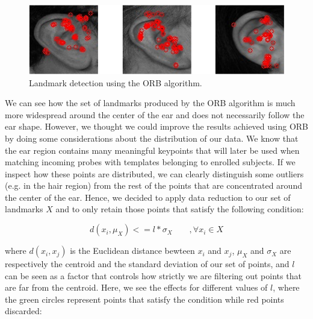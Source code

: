 \documentclass{article}
\begin{document}
\begin{figure}[h]
    \label{fig:landmark_orb}
    \begin{center}
        \includegraphics[width=12cm,keepaspectratio]{images/landmark_orb.png}
        \caption{Landmark detection using the ORB algorithm.}
    \end{center}
\end{figure}

We can see how the set of landmarks produced by the ORB algorithm is much more widespread around the
center of the ear and does not necessarily follow the ear shape. However, we thought we could improve the
results achieved using ORB by doing some considerations about the distribution of our data. We know that the ear
region contains many meaningful keypoints that will later be used when matching incoming probes with templates
belonging to enrolled subjects. If we inspect how these points are distributed, we can clearly distinguish some
outliers (e.g. in the hair region) from the rest of the points that are concentrated around the center of the ear.
Hence, we decided to apply data reduction to our set of landmarks $X$ and to only retain those points that
satisfy the following condition:

$$ d(x_i, \mu_X) <= l * \sigma_X \quad \quad , \forall x_i \in X $$

where $d(x_i,x_j)$ is the Euclidean distance bewteen $x_i$ and $x_j$, $\mu_X$ and $\sigma_X$ are respectively the
centroid and the standard deviation of our set of points, and $l$ can be seen as a factor that controls how strictly
we are filtering out points that are far from the centroid. Here, we see the effects for different values of $l$,
where the green circles represent points that satisfy the condition while red points discarded:
\end{document}
